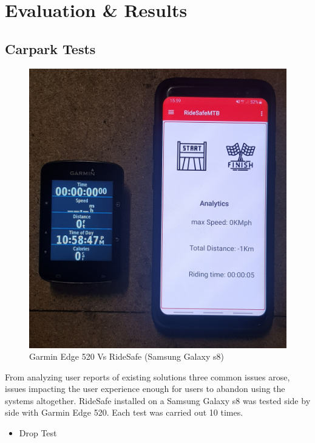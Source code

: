 \chapter{Evaluation \& Results}

\section{Carpark Tests}




\begin{figure}[h]
      \centering
      \includegraphics[scale = .1]{evaluation/gvr.jpg}
      \caption{Garmin Edge 520 Vs RideSafe (Samsung Galaxy s8)}
      \label{trail}
\end{figure}


From analyzing user reports of existing solutions three common issues arose, issues impacting the user experience enough for users to abandon using the systems altogether. 
RideSafe installed on a Samsung Galaxy s8 was tested side by side with Garmin Edge 520.
Each test was carried out 10 times.

\begin{itemize}
\item Drop Test
\end {itemize}

